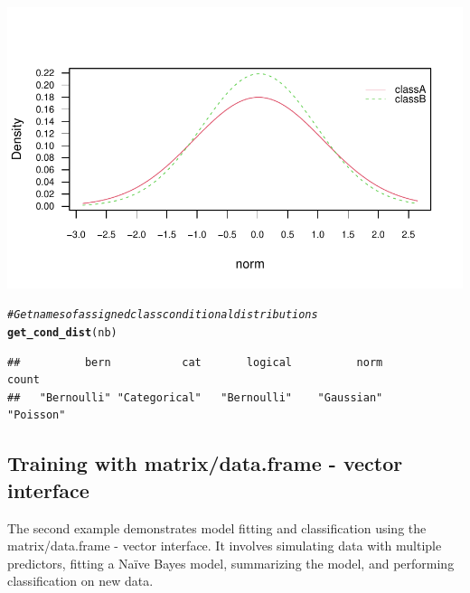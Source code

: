 \documentclass{article}\usepackage[]{graphicx}\usepackage[]{xcolor}
\makeatletter
\def\maxwidth{ %
  \ifdim\Gin@nat@width>\linewidth
    \linewidth
  \else
    \Gin@nat@width
  \fi
}
\newcommand{\hlcom}[1]{\textcolor[rgb]{0.678,0.584,0.686}{\textit{#1}}}%
\newcommand{\hlstd}[1]{\textcolor[rgb]{0.345,0.345,0.345}{#1}}%
\newcommand{\hlkwd}[1]{\textcolor[rgb]{0.737,0.353,0.396}{\textbf{#1}}}%
\newenvironment{kframe}{%
 \def\at@end@of@kframe{}%
 \ifinner\ifhmode%
  \def\at@end@of@kframe{\end{minipage}}%
  \begin{minipage}{\columnwidth}%
 \fi\fi%
 \def\FrameCommand##1{\hskip\@totalleftmargin \hskip-\fboxsep
 \colorbox{shadecolor}{##1}\hskip-\fboxsep
     \hskip-\linewidth \hskip-\@totalleftmargin \hskip\columnwidth}%
 \MakeFramed {\advance\hsize-\width
   \@totalleftmargin\z@ \linewidth\hsize
   \@setminipage}}%
 {\par\unskip\endMakeFramed%
 \at@end@of@kframe}
\newenvironment{knitrout}{}{} %
\makeatother
\begin{document}
\begin{knitrout}
\begin{kframe}
\end{kframe}
\includegraphics[width=\maxwidth]{figure/unnamed-chunk-4-1} 
\begin{kframe}\begin{alltt}
\hlcom{# Get names of assigned class conditional distributions}
\hlkwd{get_cond_dist}\hlstd{(nb)}
\end{alltt}
\begin{verbatim}
##          bern           cat       logical          norm         count 
##   "Bernoulli" "Categorical"   "Bernoulli"    "Gaussian"     "Poisson"
\end{verbatim}
\end{kframe}
\end{knitrout}


\subsection{Training with matrix/data.frame - vector interface}

The second example demonstrates model fitting and classification using the matrix/data.frame - vector interface. It involves simulating data with multiple predictors, fitting a Na\"ive Bayes model, summarizing the model, and performing classification on new data.
\end{document}
